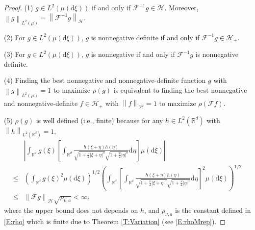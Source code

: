 \documentclass[12pt]{report}
\theoremstyle{plain}
\theoremstyle{definition}
\numberwithin{equation}{section}
\newcommand{\R}{\mathbb{R}}
\newcommand{\Norm}[1]{\left\|  #1   \right\|}
\newcommand{\ud}{\ensuremath{ \mathrm{d} }}
\begin{document}
\begin{proof}
	\noindent (1) $g\in L^2\left(\mu\left(\ud \xi\right)\right)$ if and only if $\mathcal{F}^{-1}g \in
	\mathcal{H}$. Moreover, $\Norm{g}_{L^2(\mu)}=\Norm{\mathcal{F}^{-1}g}_{\mathcal{H}}$.
	
	\noindent (2) For $g\in L^2\left(\mu\left(\ud \xi\right)\right)$, $g$ is nonnegative definite if
	and only if $\mathcal{F}^{-1}g \in \mathcal{H}_+$.
	
	\noindent (3) For $g\in L^2\left(\mu\left(\ud \xi\right)\right)$, $g$ is nonnegative if and only
	if $\mathcal{F}^{-1}g$ is nonnegative definite.
	
	\noindent (4) Finding the best nonnegative and nonnegative-definite function $g$ with
	$\Norm{g}_{L^2(\mu)}=1$ to maximize $\rho(g)$ is equivalent to finding the best
	nonnegative and nonnegative-definite $f\in \mathcal{H}_+$ with $\Norm{f}_{\mathcal{H}}=1$ to
	maximize $\rho\left(\mathcal{F}f\right)$.
	
	\noindent (5) $\rho(g)$ is well defined (i.e., finite) because for any $h\in
	L^2(\R^d)$ with $\Norm{h}_{L^2(\R^d)}=1$,
	\begin{align*}
	& \left|\int_{\R^d}g(\xi)
	\left[
	\int_{\R^d} \frac{h(\xi + \eta)h(\eta)}{\sqrt{1+\frac{\nu}{2}|\xi+\eta|^a}\sqrt{1+\frac{\nu}{2}|\eta|^a}} \ud \eta
	\right]
	\mu(\ud \xi) \right| \\
	\le & \left(\int_{\R^d}g(\xi)^2 \mu(\ud\xi) \right)^{1/2}
	\left(
	\int_{\R^d}
	\left[
	\int_{\R^d} \frac{h(\xi + \eta)h(\eta)}{\sqrt{1+\frac{\nu}{2}|\xi+\eta|^a}\sqrt{1+\frac{\nu}{2}|\eta|^a}} \ud \eta
	\right]^2
	\mu(\ud \xi)
	\right)^{1/2} \\
	\le & \Norm{\mathcal{F}g}_{\mathcal{H}} \sqrt{\rho_{\nu,a}}<\infty,
	\end{align*}
	where the upper bound does not depends on $h$, and $\rho_{\nu,a}$ is the constant defined in
	\eqref{E:rho} which is finite due to Theorem \ref{T:Variation} (see \eqref{E:rhoMrep}).
	

\end{proof}
\end{document}
